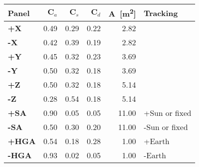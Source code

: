 \begin{tabular}{lrrrrl}
\toprule
\bfseries Panel & \bfseries $\mathbf C_a$ & \bfseries $\mathbf C_s$ & \bfseries $\mathbf C_d$ & \bfseries $\mathbf A$~[\unit{\meter\squared}] & \bfseries Tracking \\
\midrule
\bfseries +X & 0.49 & 0.29 & 0.22 & 2.82 &  \\
\bfseries -X & 0.42 & 0.39 & 0.19 & 2.82 &  \\
\bfseries +Y & 0.45 & 0.32 & 0.23 & 3.69 &  \\
\bfseries -Y & 0.50 & 0.32 & 0.18 & 3.69 &  \\
\bfseries +Z & 0.50 & 0.32 & 0.18 & 5.14 &  \\
\bfseries -Z & 0.28 & 0.54 & 0.18 & 5.14 &  \\
\bfseries +SA & 0.90 & 0.05 & 0.05 & 11.00 & +Sun or fixed \\
\bfseries -SA & 0.50 & 0.30 & 0.20 & 11.00 & -Sun or fixed \\
\bfseries +HGA & 0.54 & 0.18 & 0.28 & 1.00 & +Earth \\
\bfseries -HGA & 0.93 & 0.02 & 0.05 & 1.00 & -Earth \\
\bottomrule
\end{tabular}
